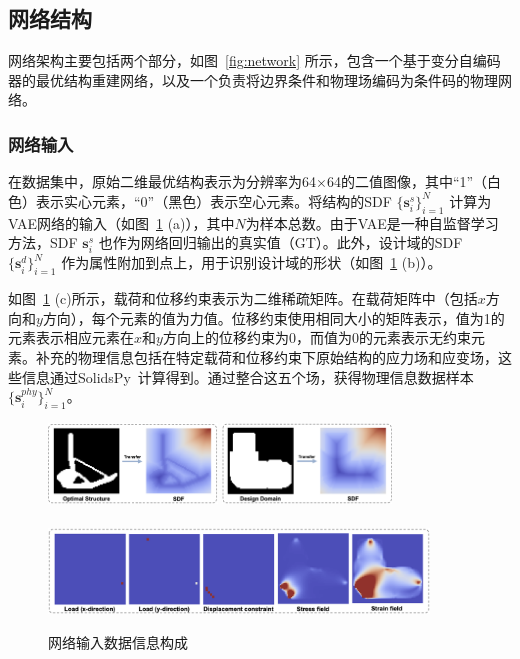 \subsection{网络结构}
网络架构主要包括两个部分，如图~\ref{fig:network} 所示，包含一个基于变分自编码器的最优结构重建网络，以及一个负责将边界条件和物理场编码为条件码的物理网络。

\subsubsection{网络输入}
在数据集中，原始二维最优结构表示为分辨率为64$\times$64的二值图像，其中“1”（白色）表示实心元素，“0”（黑色）表示空心元素。将结构的SDF $\{\mathbf{s}^s_i\}_{i=1}^N$ 计算为VAE网络的输入（如图~\ref{fig:input} (a)），其中$N$为样本总数。由于VAE是一种自监督学习方法，SDF $\mathbf{s}^s_i$ 也作为网络回归输出的真实值（GT）。此外，设计域的SDF $\{\mathbf{s}^d_i\}_{i=1}^N$ 作为属性附加到点上，用于识别设计域的形状（如图~\ref{fig:input} (b)）。

如图~\ref{fig:input} (c)所示，载荷和位移约束表示为二维稀疏矩阵。在载荷矩阵中（包括$x$方向和$y$方向），每个元素的值为力值。位移约束使用相同大小的矩阵表示，值为1的元素表示相应元素在$x$和$y$方向上的位移约束为0，而值为0的元素表示无约束元素。补充的物理信息包括在特定载荷和位移约束下原始结构的应力场和应变场，这些信息通过SolidsPy~\cite{solidspy}计算得到。通过整合这五个场，获得物理信息数据样本$\{\mathbf{s}^{phy}_i\}_{i=1}^N$。

\begin{figure}[htbp]
    \centering
    \includegraphics[width=0.4\textwidth]{./figures/TONIR/input-a.png}
    \hspace{0.08\textwidth}
    \includegraphics[width=0.4\textwidth]{./figures/TONIR/input-b.png}
    \\
    \hspace{0.08\textwidth}
    \\
    \vspace{0.1 cm}
    \includegraphics[width=0.9\textwidth]{./figures/TONIR/input-c.png}
    \\
    \caption{网络输入数据信息构成}
    \label{fig:input}
\end{figure}


